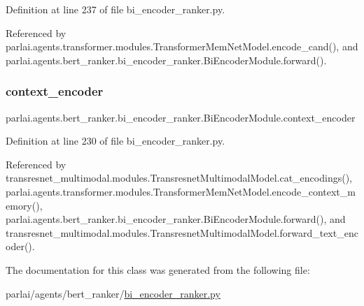 Definition at line 237 of file bi\+\_\+encoder\+\_\+ranker.\+py.



Referenced by parlai.\+agents.\+transformer.\+modules.\+Transformer\+Mem\+Net\+Model.\+encode\+\_\+cand(), and parlai.\+agents.\+bert\+\_\+ranker.\+bi\+\_\+encoder\+\_\+ranker.\+Bi\+Encoder\+Module.\+forward().

\mbox{\label{classparlai_1_1agents_1_1bert__ranker_1_1bi__encoder__ranker_1_1BiEncoderModule_aa92bf5d244fe4f11ea2211353d7aad6f}} 
\subsubsection{\texorpdfstring{context\+\_\+encoder}{context\_encoder}}
{\footnotesize\ttfamily parlai.\+agents.\+bert\+\_\+ranker.\+bi\+\_\+encoder\+\_\+ranker.\+Bi\+Encoder\+Module.\+context\+\_\+encoder}



Definition at line 230 of file bi\+\_\+encoder\+\_\+ranker.\+py.



Referenced by transresnet\+\_\+multimodal.\+modules.\+Transresnet\+Multimodal\+Model.\+cat\+\_\+encodings(), parlai.\+agents.\+transformer.\+modules.\+Transformer\+Mem\+Net\+Model.\+encode\+\_\+context\+\_\+memory(), parlai.\+agents.\+bert\+\_\+ranker.\+bi\+\_\+encoder\+\_\+ranker.\+Bi\+Encoder\+Module.\+forward(), and transresnet\+\_\+multimodal.\+modules.\+Transresnet\+Multimodal\+Model.\+forward\+\_\+text\+\_\+encoder().



The documentation for this class was generated from the following file\+:\begin{DoxyCompactItemize}
\item 
parlai/agents/bert\+\_\+ranker/\hyperlink{bi__encoder__ranker_8py}{bi\+\_\+encoder\+\_\+ranker.\+py}\end{DoxyCompactItemize}
